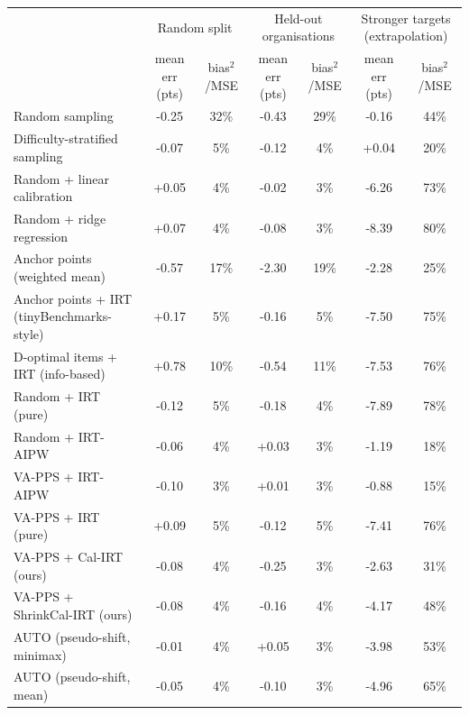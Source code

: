 \begin{tabular}{lcccccc}
\toprule
 & \multicolumn{2}{c}{Random split} & \multicolumn{2}{c}{Held-out organisations} & \multicolumn{2}{c}{Stronger targets (extrapolation)} \\
 & mean err (pts) & bias$^2$/MSE & mean err (pts) & bias$^2$/MSE & mean err (pts) & bias$^2$/MSE \\
\midrule
Random sampling & -0.25 & 32\% & -0.43 & 29\% & -0.16 & 44\% \\
Difficulty-stratified sampling & -0.07 & 5\% & -0.12 & 4\% & +0.04 & 20\% \\
Random + linear calibration & +0.05 & 4\% & -0.02 & 3\% & -6.26 & 73\% \\
Random + ridge regression & +0.07 & 4\% & -0.08 & 3\% & -8.39 & 80\% \\
Anchor points (weighted mean) & -0.57 & 17\% & -2.30 & 19\% & -2.28 & 25\% \\
Anchor points + IRT (tinyBenchmarks-style) & +0.17 & 5\% & -0.16 & 5\% & -7.50 & 75\% \\
D-optimal items + IRT (info-based) & +0.78 & 10\% & -0.54 & 11\% & -7.53 & 76\% \\
Random + IRT (pure) & -0.12 & 5\% & -0.18 & 4\% & -7.89 & 78\% \\
Random + IRT-AIPW & -0.06 & 4\% & +0.03 & 3\% & -1.19 & 18\% \\
VA-PPS + IRT-AIPW & -0.10 & 3\% & +0.01 & 3\% & -0.88 & 15\% \\
VA-PPS + IRT (pure) & +0.09 & 5\% & -0.12 & 5\% & -7.41 & 76\% \\
VA-PPS + Cal-IRT (ours) & -0.08 & 4\% & -0.25 & 3\% & -2.63 & 31\% \\
VA-PPS + ShrinkCal-IRT (ours) & -0.08 & 4\% & -0.16 & 4\% & -4.17 & 48\% \\
AUTO (pseudo-shift, minimax) & -0.01 & 4\% & +0.05 & 3\% & -3.98 & 53\% \\
AUTO (pseudo-shift, mean) & -0.05 & 4\% & -0.10 & 3\% & -4.96 & 65\% \\
\bottomrule
\end{tabular}
